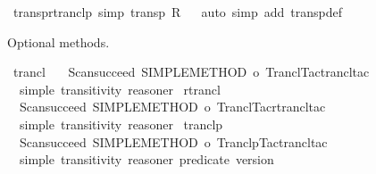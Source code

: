 \begin{isabellebody}
{\isacartoucheclose}%
\endisatagML
{\isafoldML}%
%
\isadelimML
\isanewline
%
\endisadelimML
\isanewline
{}\isamarkupfalse%
\ transp{\isacharunderscore}{\kern0pt}rtranclp\ {\isacharbrackleft}{\kern0pt}simp{\isacharbrackright}{\kern0pt}{\isacharcolon}{\kern0pt}\ {\isachardoublequoteopen}transp\ R\isactrlsup {\isacharasterisk}{\kern0pt}\isactrlsup {\isacharasterisk}{\kern0pt}{\isachardoublequoteclose}\isanewline
%
\isadelimproof
\ \ %
\endisadelimproof
%
\isatagproof
{}\isamarkupfalse%
{\isacharparenleft}{\kern0pt}auto\ simp\ add{\isacharcolon}{\kern0pt}\ transp{\isacharunderscore}{\kern0pt}def{\isacharparenright}{\kern0pt}%
\endisatagproof
{\isafoldproof}%
%
\isadelimproof
%
\endisadelimproof
%
\begin{isamarkuptext}%
Optional methods.%
\end{isamarkuptext}\isamarkuptrue%
%
\isadelimML
%
\endisadelimML
%
\isatagML
{}\isamarkupfalse%
\ trancl\ {\isacharequal}{\kern0pt}\isanewline
\ \ {\isacartoucheopen}Scan{\isachardot}{\kern0pt}succeed\ {\isacharparenleft}{\kern0pt}SIMPLE{\isacharunderscore}{\kern0pt}METHOD{\isacharprime}{\kern0pt}\ o\ Trancl{\isacharunderscore}{\kern0pt}Tac{\isachardot}{\kern0pt}trancl{\isacharunderscore}{\kern0pt}tac{\isacharparenright}{\kern0pt}{\isacartoucheclose}\isanewline
\ \ {\isacartoucheopen}simple\ transitivity\ reasoner{\isacartoucheclose}\isanewline
{}\isamarkupfalse%
\ rtrancl\ {\isacharequal}{\kern0pt}\isanewline
\ \ {\isacartoucheopen}Scan{\isachardot}{\kern0pt}succeed\ {\isacharparenleft}{\kern0pt}SIMPLE{\isacharunderscore}{\kern0pt}METHOD{\isacharprime}{\kern0pt}\ o\ Trancl{\isacharunderscore}{\kern0pt}Tac{\isachardot}{\kern0pt}rtrancl{\isacharunderscore}{\kern0pt}tac{\isacharparenright}{\kern0pt}{\isacartoucheclose}\isanewline
\ \ {\isacartoucheopen}simple\ transitivity\ reasoner{\isacartoucheclose}\isanewline
{}\isamarkupfalse%
\ tranclp\ {\isacharequal}{\kern0pt}\isanewline
\ \ {\isacartoucheopen}Scan{\isachardot}{\kern0pt}succeed\ {\isacharparenleft}{\kern0pt}SIMPLE{\isacharunderscore}{\kern0pt}METHOD{\isacharprime}{\kern0pt}\ o\ Tranclp{\isacharunderscore}{\kern0pt}Tac{\isachardot}{\kern0pt}trancl{\isacharunderscore}{\kern0pt}tac{\isacharparenright}{\kern0pt}{\isacartoucheclose}\isanewline
\ \ {\isacartoucheopen}simple\ transitivity\ reasoner\ {\isacharparenleft}{\kern0pt}predicate\ version{\isacharparenright}{\kern0pt}{\isacartoucheclose}\isanewline
{}\isamarkupfalse%

\end{isabellebody}
